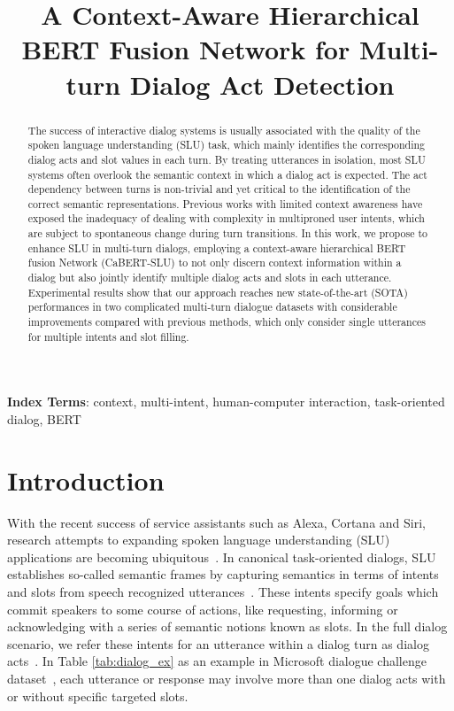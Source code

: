 \documentclass[a4paper]{article}
\title{A Context-Aware Hierarchical BERT Fusion Network for Multi-turn Dialog Act Detection}
\begin{document}
\maketitle
% 
\begin{abstract}
The success of interactive dialog systems is usually associated with the quality of the spoken language understanding (SLU) task, which mainly identifies the corresponding dialog acts and slot values in each turn. By treating utterances in isolation, most SLU systems often overlook the semantic context in which a dialog act is expected. The act dependency between turns is non-trivial and yet critical to the identification of the correct semantic representations. Previous works with limited context awareness have exposed the inadequacy of dealing with complexity in multiproned user intents, which are subject to spontaneous change during turn transitions. In this work, we propose to enhance SLU in multi-turn dialogs, employing a context-aware hierarchical BERT fusion Network (CaBERT-SLU) to not only discern context information within a dialog but also jointly identify multiple dialog acts and slots in each utterance. Experimental results show that our approach reaches new state-of-the-art (SOTA) performances in two complicated multi-turn dialogue datasets with considerable improvements compared with previous methods, which only consider single utterances for multiple intents and slot filling. 

\end{abstract}
\noindent\textbf{Index Terms}: context, multi-intent, human-computer interaction, task-oriented dialog, BERT


\section{Introduction}

With the recent success of service assistants such as Alexa, Cortana and Siri, research attempts to expanding spoken language understanding (SLU) applications are becoming ubiquitous~\cite{zhang2020recent}. In canonical task-oriented dialogs, SLU establishes so-called semantic frames by capturing semantics in terms of intents and slots from speech recognized utterances~\cite{weld2021survey}.  These intents specify goals which commit speakers to some course of actions, like requesting, informing or acknowledging with a series of semantic notions known as slots. In the full dialog scenario, we refer these intents for an utterance within a dialog turn as dialog acts~\cite{abbeduto_1983}.
In Table \ref{tab:dialog_ex} as an example in Microsoft dialogue challenge dataset~\cite{li2018microsoft}, each utterance or response may involve more than one dialog acts with or without specific targeted slots.
\end{document}
